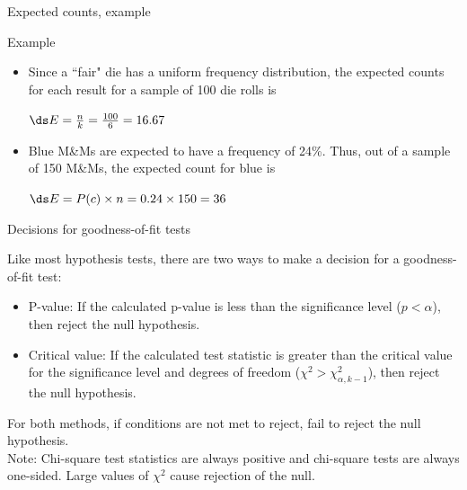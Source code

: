 \documentclass[xcolor=table, aspectratio=169, bigger]{beamer}
\begin{document}
\begin{frame}{Expected counts, example}
\begin{exampleblock}{Example}
\begin{itemize}
\item Since a ``fair" die has a uniform frequency distribution, the expected counts for each result for a sample of 100 die rolls is\\
\medskip
{\centering
$\ds E = \frac n k = \frac {100} 6 = 16.67$
\par}
\medskip

\pause\item Blue M\&Ms are expected to have a frequency of 24\%. Thus, out of a sample of 150 M\&Ms, the expected count for blue is\\
\medskip
{\centering
$\ds E = P(c) \times n = 0.24 \times 150 = 36$
\par}
\medskip
\end{itemize}
\end{exampleblock}
\end{frame}

\begin{frame}{Decisions for goodness-of-fit tests}
\begin{block}{}
Like most hypothesis tests, there are two ways to make a decision for a goodness-of-fit test:
\begin{itemize}
\pause\item P-value: If the calculated p-value is less than the significance level ($p < \alpha$), then reject the null hypothesis.
\pause\item Critical value: If the calculated test statistic is greater than the critical value for the significance level and degrees of freedom ($\chi^2 > \chi^2_{\alpha, k-1}$), then reject the null hypothesis.
\end{itemize}
\pause\medskip
For both methods, if conditions are not met to reject, fail to reject the null hypothesis.\\
\pause\medskip
Note: Chi-square test statistics are always positive and chi-square tests are always one-sided. Large values of $\chi^2$ cause rejection of the null.
\end{block}
\end{frame}
\end{document}
